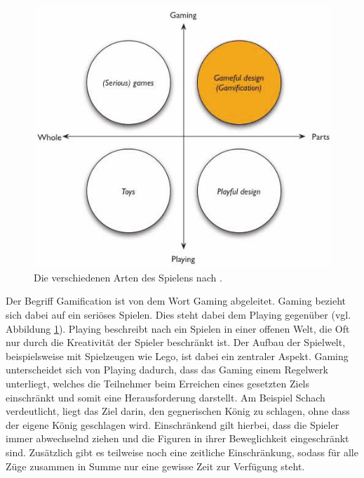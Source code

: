 \documentclass[
	oneside,  %
	ngerman, 
	final, 
	11pt, 
	a4paper, 
	1.1headlines, 
	headinclude=false, 
	footinclude=false, 
	mpinclude=false, 
	pagesize, 
	onecolumn, 
	titlepage, 
	parskip=half, 
	headsepline, 
	chapterprefix=false, 
	version=first, 
	listof=totoc, 
	bibliography=totoc, 
	toc=graduated, 
	fleqn
]{scrbook}
\begin{document}
\begin{figure}[htb]
	\begin{center}
		\includegraphics[scale=0.6]{images/gamification_einordnung}
		\caption{Die verschiedenen Arten des Spielens nach \cite{DD2011}.}
		\label{gamification_einordnung}
	\end{center}
\end{figure}

Der Begriff Gamification ist von dem Wort \glqq Gaming \grqq{} abgeleitet.
Gaming bezieht sich dabei auf ein seriöses Spielen.
Dies steht dabei dem \glqq Playing \grqq{} gegenüber (vgl. Abbildung \ref{gamification_einordnung}).
Playing beschreibt nach \cite{Wa2003} ein Spielen in einer offenen Welt, die Oft nur durch die Kreativität der Spieler beschränkt ist.
Der Aufbau der Spielwelt, beispielsweise mit Spielzeugen wie Lego, ist dabei ein zentraler Aspekt.
Gaming unterscheidet sich\cite{DD2011} von Playing dadurch, dass das Gaming einem Regelwerk unterliegt, welches die Teilnehmer beim Erreichen eines gesetzten Ziels einschränkt und somit eine Herausforderung darstellt.
Am Beispiel Schach verdeutlicht, liegt das Ziel darin, den gegnerischen König zu schlagen, ohne dass der eigene König geschlagen wird.
Einschränkend gilt hierbei, dass die Spieler immer abwechselnd ziehen und die Figuren in ihrer Beweglichkeit eingeschränkt sind.
Zusätzlich gibt es teilweise noch eine zeitliche Einschränkung, sodass für alle Züge zusammen in Summe nur eine gewisse Zeit zur Verfügung steht.
\end{document}
